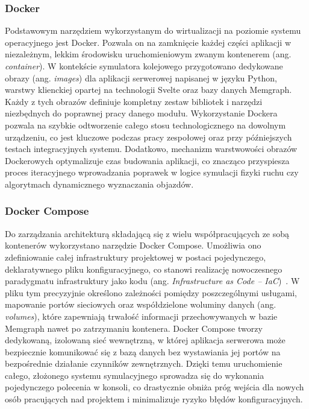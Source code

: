 \documentclass[twoside]{projektInzynierskiMS1z}
\begin{document}
\subsubsection{Docker}

Podstawowym narzędziem wykorzystanym do wirtualizacji na poziomie systemu operacyjnego
jest Docker. Pozwala on na zamknięcie każdej części aplikacji w niezależnym, lekkim
środowisku uruchomieniowym zwanym kontenerem (ang. \emph{container}). W kontekście
symulatora kolejowego przygotowano dedykowane obrazy (ang. \emph{images}) dla aplikacji
serwerowej napisanej w języku Python, warstwy klienckiej opartej na technologii Svelte
oraz bazy danych Memgraph. Każdy z tych obrazów definiuje kompletny zestaw bibliotek
i narzędzi niezbędnych do poprawnej pracy danego modułu. Wykorzystanie Dockera pozwala
na szybkie odtworzenie całego stosu technologicznego na dowolnym urządzeniu, co jest
kluczowe podczas pracy zespołowej oraz przy późniejszych testach integracyjnych systemu.
Dodatkowo, mechanizm warstwowości obrazów Dockerowych optymalizuje czas budowania
aplikacji, co znacząco przyspiesza proces iteracyjnego wprowadzania poprawek w logice
symulacji fizyki ruchu czy algorytmach dynamicznego wyznaczania objazdów.

\subsubsection{Docker Compose}

Do zarządzania architekturą składającą się z wielu współpracujących ze sobą kontenerów
wykorzystano narzędzie Docker Compose. Umożliwia ono zdefiniowanie całej infrastruktury
projektowej w postaci pojedynczego, deklaratywnego pliku konfiguracyjnego, co stanowi
realizację nowoczesnego paradygmatu infrastruktury jako kodu (ang. \emph{Infrastructure
as Code -- IaC})~\cite{infrastructureascode}. W pliku tym precyzyjnie określono
zależności pomiędzy poszczególnymi usługami, mapowanie portów sieciowych oraz
współdzielone woluminy danych (ang. \emph{volumes}), które zapewniają trwałość
informacji przechowywanych w bazie Memgraph nawet po zatrzymaniu kontenera. Docker
Compose tworzy dedykowaną, izolowaną sieć wewnętrzną, w której aplikacja serwerowa może
bezpiecznie komunikować się z bazą danych bez wystawiania jej portów na bezpośrednie
działanie czynników zewnętrznych. Dzięki temu uruchomienie całego, złożonego systemu
symulacyjnego sprowadza się do wykonania pojedynczego polecenia w konsoli, co
drastycznie obniża próg wejścia dla nowych osób pracujących nad projektem
i minimalizuje ryzyko błędów konfiguracyjnych.
\end{document}
